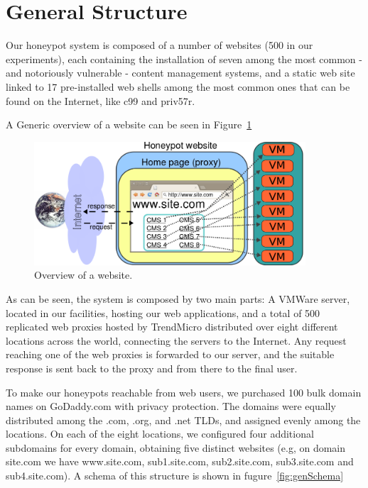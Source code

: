 \section{General Structure}

Our honeypot system is composed of a number of websites (500 in our experiments), each containing the installation of seven among the most common - and notoriously vulnerable - content management systems, and a static web site linked to 17 pre-installed web shells among the most common ones that can be found on the Internet, like c99 and priv57r.

A Generic overview of a website can be seen in Figure~\ref{fig:websiteView}

\begin{figure}[tbh]
\centerline{\includegraphics[width=0.9\textwidth]{Images/websiteOverview.png}}
\caption{Overview of a website.\label{fig:websiteView}}
\end{figure}

As can be seen, the system is composed by two main parts: A VMWare server, located in our facilities, hosting our web applications, and a total of 500 replicated web proxies hosted by TrendMicro distributed over eight different locations across the world, connecting the servers to the Internet. Any request reaching one of the web proxies is forwarded to our server, and the suitable response is sent back to the proxy and from there to the final user.

To make our honeypots reachable from web users, we purchased 100 bulk domain names on GoDaddy.com with privacy protection. The domains were equally distributed among the .com, .org, and .net TLDs, and assigned evenly among the locations.
On each of the eight locations, we configured four additional subdomains for every domain, obtaining five distinct websites (e.g, on domain site.com we have www.site.com, sub1.site.com, sub2.site.com, sub3.site.com and sub4.site.com). A schema of this structure is shown in fugure~\ref{fig:genSchema}


